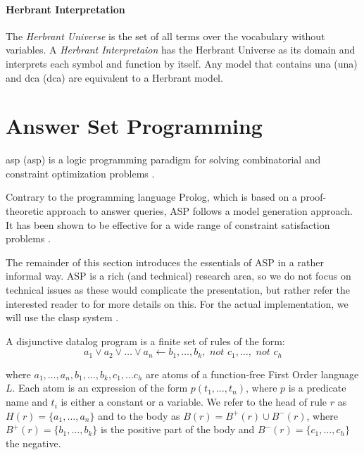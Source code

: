 \paragraph{Herbrant Interpretation} The \textit{Herbrant Universe} is the set of all terms over the vocabulary without variables. A \textit{Herbrant Interpretaion} has the Herbrant Universe as its domain and interprets each symbol and function by itself. Any model that contains \acrlong{una} (\acrshort{una}) \parencite{UNA} and \acrlong{dca} (\acrshort{dca}) \parencite{DCA} are equivalent to a Herbrant model.


\section{Answer Set Programming}
\acrlong{asp} (\acrshort{asp}) is a logic programming paradigm for solving combinatorial and constraint optimization problems \parencite{whatisasp}.

Contrary to the programming language Prolog, which is based on a proof-theoretic approach to answer queries, ASP follows a model generation approach. It has been shown to be effective for a wide range of constraint satisfaction problems \parencite{aspbook}.

The remainder of this section introduces the essentials of ASP in a rather informal way. ASP is a rich (and technical) research area, so we do not focus on technical issues as these would complicate the presentation, but rather refer the interested reader to \textcite{aspbook,eiter,leone,DBLP:conf/aaai/Lifschitz08} for more details on this. For the actual implementation, we will use the clasp system \parencite{aspbook,BrewkaCACM}.

\begin{definition}
  A disjunctive datalog program is a finite set of rules of the form: 
  \begin{equation*}
    a_1 \vee a_2 \vee \dots \vee a_n \leftarrow b_1, \dots, b_k, \textit{ not }c_1,\dots,\textit{ not }c_h 
  \end{equation*}
\end{definition}
where $a_1, \dots, a_n, b_1, \dots, b_k,c_1, \dots c_h$ are atoms of a function-free First Order language $L$. Each atom is an expression of the form $p(t_1,\ldots,t_n)$, where $p$ is a predicate name and $t_i$ is either a constant or a variable. We refer to the head of rule $r$ as $H(r) = \{a_1,\dots,a_n\}$ and to the body as $B(r) = B^{+}(r) \cup B^{-}(r)$, where $B^{+}(r) = \{ b_1, \dots, b_k \}$ is the positive part of the body and $B^{-}(r) = \{ c_1, \dots, c_h \}$ the negative. 

